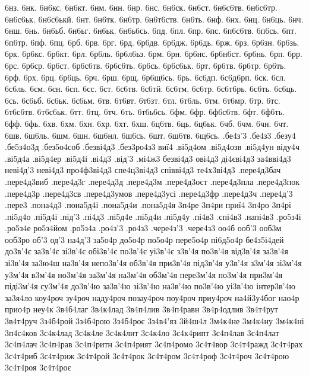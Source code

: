{6нз. 6нк. 6н6кс. 6н6кт. 6нм. 6нн. 6нр. 6нс. 
6н6ск. 6н6ст. 6н6с6тв. 6н6с6тр. 6н6с6ьк. 6н6с6ькй. 6нт. 6н6тк. 
6н6тр. 6н6т6ств. 6н6ть. 6нф. 6нх. 6нц. 6н6ць. 6нч. 
6нш. 6нь. 6н6ьб. 6н6ьг. 6н6ьк. 6н6ь6сь. 6пд. 6пл. 
6пр. 6пс. 6п6с6тв. 6п6сь. 6пт. 6п6тр. 6пф. 6пц. 
6рб. 6рв. 6рг. 6рд. 6р6дв. 6р6дж. 6р6дь. 6рж. 
6рз. 6р6зн. 6р6зь. 6рк. 6р6кс. 6р6кт. 6рл. 6р6ль. 
6р6л6ьз. 6рм. 6рн. 6р6нс. 6р6н6ст. 6р6нь. 6рп. 6рр. 
6рс. 6р6ср. 6р6ст. 6р6с6тв. 6р6с6ть. 6р6сь. 6р6с6ьк. 6рт. 
6р6тв. 6р6тр. 6р6ть. 6рф. 6рх. 6рц. 6р6ць. 6рч. 
6рш. 6рщ. 6р6щ6сь. 6рь. 6с6дп. 6с6д6рп. 6ск. 6сл. 
6с6ль. 6см. 6сн. 6сп. 6сс. 6ст. 6с6тв. 6с6тй. 
6с6тм. 6с6тр. 6с6т6рь. 6с6ть. 6с6ць. 6сь. 6с6ьб. 6с6ьк. 
6с6ьм. 6тв. 6т6вт. 6т6зт. 6тл. 6т6ль. 6тм. 6т6мр. 
6тр. 6тс. 6т6с6тв. 6т6с6ьк. 6тт. 6тц. 6тч. 6ть. 
6т6ь6сь. 6фм. 6фр. 6ф6с6тв. 6фт. 6ф6ть. 6фф. 6фь. 
6хв. 6хм. 6хн. 6хр. 6хт. 6хш. 6ц6тв. 6ць. 
6ц6ьк. 6чб. 6чм. 6чн. 6чт. 6шв. 6ш6ль. 6шм. 
6шн. 6ш6нл. 6ш6сь. 6шт. 6ш6тв. 6щ6сь. 
.бе4з'3
.бе4з3
.безу4
.бе5з4о3д
.без5о4соб
.безві4д3
.без3ро4з3
виї4
.ві5д4ом
.ві5д4озв
.ві5д4ун
віду4ч
.ві5д4а
.ві5д4ер
.ві5д4і
.ві4д3
.від'3
.мі4ж3
безві4д3
ові4д3
ді4єві4д3
за4вві4д3
неві4д'3
неві4д3
про4ф3ві4д3
спе4ц3ві4д3
співві4д3
те4х3ві4д3
.пере4д3бач
.пере4д3виб
.пере4д3г
.пере4д3д
.пере4д3м
.пере4д3ост
.пере4д3пла
.пере4д3пок
.пере4д3р
.пере4д3св
.пере4д3умов
.пере4д3усі
.пере4д3фр
.пере4д3ч
.пере4д'3
.пере3
.пона4д3
.пона5д4і
.пона5д4и
.пона5д4я
3п4ре
3п4ри
приї4
3п4ро
3п4рі
.пі5д4о
.пі5д4і
.під'3
.пі4д3
.пі5д4е
.пі5д4и
.пі5д4у
.пі4в3
.спі4в3
.напі4в3
.ро5з4і
.ро5з4е
ро5з4йом
.ро5з4а
.ро4з'3
.ро4з3
.чере4з'3
.чере4з3
оо4б
ооб'3
ооб3м
ооб3ро
об'3
од'3
на4д'3
за5о4р
до5о4р
по5о4р
пере5о4р
пі6д5о4р
бе4з5і4дей
до3в'4є
за3в'4є
зі3в'4є
обі3в'4є
по3в'4є
уі3в'4є
з3в'4я
по3в'4я
від3в'4я
за3в'4я
зі3в'4я
за3ю4ш
на3в'4я
непо3в'4я
об3в'4я
при3в'4я
під3в'4я
у3в'4я
з3м'4я
зі3м'4я
у3м'4я
в3м'4я
но3м'4я
за3м'4я
на3м'4я
об3м'4я
пере3м'4я
по3м'4я
при3м'4я
піді3м'4я
су3м'4я
до3в'4ю
за3в'4ю
зі3в'4ю
на3в'4ю
по3в'4ю
уі3в'4ю
інтер3в'4ю
за3я4ло
коу4роч
зу4роч
наду4роч
позау4роч
поу4роч
приу4роч
на4й3у4бог
нао4р
прио4р
неу4к
3в4б4лаг
3в4к4лад
3в4п4лив
3в4п4равн
3в4р4одлив
3в4т4рут
3в4т4руч
3з4б4рой
3з4б4рою
3з4б4роє
3з4в4'яз
3й4ш4л
3м4к4не
3м4к4ну
3м4к4ні
3п4с4ков
3с4к4лад
3с4к4ле
3с4к4лит
3с4к4ло
3с4к4рипт
3с4п4лав
3с4п4лат
3с4п4лач
3с4п4рав
3с4п4ритн
3с4п4рият
3с4п4ромо
3с4т4вор
3с4т4ражд
3с4т4рах
3с4т4риб
3с4т4риж
3с4т4рой
3с4т4рок
3с4т4ром
3с4т4роф
3с4т4роч
3с4т4рою
3с4т4роя
3с4т4роє
}
